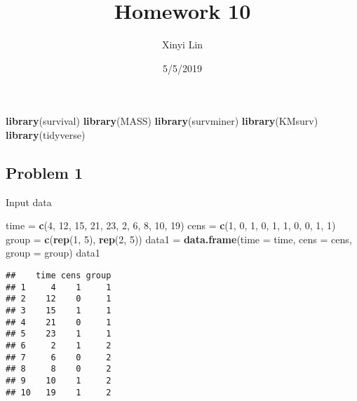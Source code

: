 \documentclass[]{article}
\title{Homework 10}
\author{Xinyi Lin}
\date{5/5/2019}
\newenvironment{Shaded}{\begin{snugshade}}{\end{snugshade}}
\newcommand{\KeywordTok}[1]{\textcolor[rgb]{0.13,0.29,0.53}{\textbf{#1}}}
\newcommand{\DataTypeTok}[1]{\textcolor[rgb]{0.13,0.29,0.53}{#1}}
\newcommand{\DecValTok}[1]{\textcolor[rgb]{0.00,0.00,0.81}{#1}}
\newcommand{\StringTok}[1]{\textcolor[rgb]{0.31,0.60,0.02}{#1}}
\newcommand{\NormalTok}[1]{#1}
\begin{document}
\maketitle

\begin{Shaded}
\begin{Highlighting}[]
\KeywordTok{library}\NormalTok{(survival)}
\KeywordTok{library}\NormalTok{(MASS)}
\KeywordTok{library}\NormalTok{(survminer)}
\KeywordTok{library}\NormalTok{(KMsurv)}
\KeywordTok{library}\NormalTok{(tidyverse)}
\end{Highlighting}
\end{Shaded}

\subsection{Problem 1}\label{problem-1}

Input data

\begin{Shaded}
\begin{Highlighting}[]
\NormalTok{time =}\StringTok{ }\KeywordTok{c}\NormalTok{(}\DecValTok{4}\NormalTok{, }\DecValTok{12}\NormalTok{, }\DecValTok{15}\NormalTok{, }\DecValTok{21}\NormalTok{, }\DecValTok{23}\NormalTok{, }\DecValTok{2}\NormalTok{, }\DecValTok{6}\NormalTok{, }\DecValTok{8}\NormalTok{, }\DecValTok{10}\NormalTok{, }\DecValTok{19}\NormalTok{)}
\NormalTok{cens =}\StringTok{ }\KeywordTok{c}\NormalTok{(}\DecValTok{1}\NormalTok{, }\DecValTok{0}\NormalTok{, }\DecValTok{1}\NormalTok{, }\DecValTok{0}\NormalTok{, }\DecValTok{1}\NormalTok{, }\DecValTok{1}\NormalTok{, }\DecValTok{0}\NormalTok{, }\DecValTok{0}\NormalTok{, }\DecValTok{1}\NormalTok{, }\DecValTok{1}\NormalTok{)}
\NormalTok{group =}\StringTok{ }\KeywordTok{c}\NormalTok{(}\KeywordTok{rep}\NormalTok{(}\DecValTok{1}\NormalTok{, }\DecValTok{5}\NormalTok{), }\KeywordTok{rep}\NormalTok{(}\DecValTok{2}\NormalTok{, }\DecValTok{5}\NormalTok{))}
\NormalTok{data1 =}\StringTok{ }\KeywordTok{data.frame}\NormalTok{(}\DataTypeTok{time =}\NormalTok{ time, }\DataTypeTok{cens =}\NormalTok{ cens, }\DataTypeTok{group =}\NormalTok{ group)}
\NormalTok{data1}
\end{Highlighting}
\end{Shaded}

\begin{verbatim}
##    time cens group
## 1     4    1     1
## 2    12    0     1
## 3    15    1     1
## 4    21    0     1
## 5    23    1     1
## 6     2    1     2
## 7     6    0     2
## 8     8    0     2
## 9    10    1     2
## 10   19    1     2
\end{verbatim}
\end{document}
